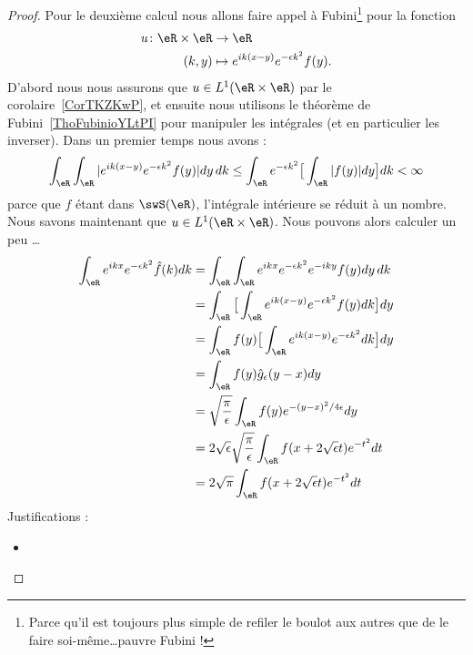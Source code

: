 \begin{proof}
    Pour le deuxième calcul nous allons faire appel à Fubini\footnote{Parce qu'il est toujours plus simple de refiler le boulot aux autres que de le faire soi-même\ldots pauvre Fubini !} pour la fonction
    \begin{equation}
        \begin{aligned}
            u\colon \eR\times \eR&\to \eR \\
            (k,y)&\mapsto  e^{ik(x-y)} e^{-\epsilon k^2}f(y).
        \end{aligned}
    \end{equation}
    D'abord nous nous assurons que \( u\in L^1(\eR\times \eR)\) par le corolaire~\ref{CorTKZKwP}, et ensuite nous utilisons le théorème de Fubini~\ref{ThoFubinioYLtPI} pour manipuler les intégrales (et en particulier les inverser). Dans un premier temps nous avons :
    \begin{equation}
        \int_{\eR}\int_{\eR}|  e^{ik(x-y)} e^{-\epsilon k^2} f(y) |dy\,dk\leq \int_{\eR} e^{-\epsilon k^2} \big[  \int_{\eR}| f(y) |   dy \big] dk<\infty
    \end{equation}
    parce que $f$ étant dans \( \swS(\eR)\), l'intégrale intérieure se réduit à un nombre. Nous savons maintenant que \( u\in L^1(\eR\times \eR)\). Nous pouvons alors calculer un peu \ldots
    \begin{subequations}
        \begin{align}
            \int_{\eR} e^{ikx} e^{-\epsilon k^2}\hat f(k)dk&=\int_{\eR}\int_{\eR} e^{ikx} e^{-\epsilon k^2} e^{-iky}f(y)dy\,dk\\
            &=\int_{\eR}\big[ \int_{\eR} e^{ik(x-y)} e^{-\epsilon k^2}f(y)dk \big]dy\\
            &=\int_{\eR}f(y)\big[   \int_{\eR} e^{ik(x-y)} e^{-\epsilon k^2}dk  \big]dy\\
            &=\int_{\eR} f(y)\hat g_{\epsilon}(y-x)dy\\
            &=\sqrt{ \frac{ \pi }{ \epsilon } }\int_{\eR}f(y) e^{-(y-x)^2/4\epsilon}dy\\
            &=2\sqrt{ \epsilon }\sqrt{ \frac{ \pi }{ \epsilon } }\int_{\eR}f(x+2\sqrt{ \epsilon }t) e^{-t^2}dt\\
            &=2\sqrt{ \pi }\int_{\eR}f(x+2\sqrt{ \epsilon }t) e^{-t^2}dt\\
        \end{align}
    \end{subequations}
    Justifications  :
    \begin{itemize}
        \item

\end{itemize}
\end{proof}
